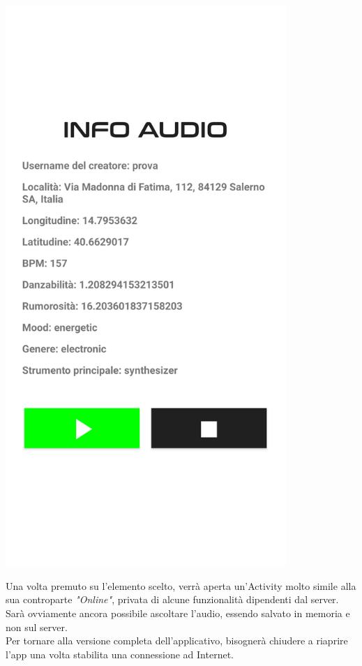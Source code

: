 \documentclass{article}
\begin{document}
\begin{minipage}[t]{0.35\textwidth}
    \centering
    \vspace*{0pt}
    \includegraphics[width=0.8\textwidth]{offlineaudiodata.png}
\end{minipage}
\hfill
\begin{minipage}[t]{0.6\textwidth}
    \raggedright
    \vspace*{50pt}
    Una volta premuto su l'elemento scelto, verrà aperta un'Activity molto simile alla sua controparte \textit{"Online"}, privata di alcune funzionalità dipendenti dal server.\vspace*{14pt}\\
    Sarà ovviamente ancora possibile ascoltare l'audio, essendo salvato in memoria e non sul server.\vspace*{14pt}\\
    Per tornare alla versione completa dell'applicativo, bisognerà chiudere a riaprire l'app una volta stabilita una connessione ad Internet.
\end{minipage}
\end{document}
